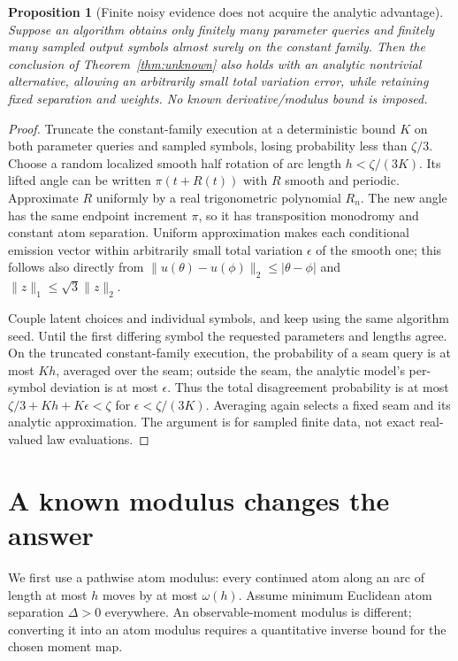 \documentclass[11pt]{article}
\newtheorem{proposition}[theorem]{Proposition}
\theoremstyle{remark}\newtheorem{remark}[theorem]{Remark}
\begin{document}
\begin{proposition}[Finite noisy evidence does not acquire the analytic advantage]\label{prop:noisy-analytic}
Suppose an algorithm obtains only finitely many parameter queries and finitely many sampled output symbols almost surely on the constant family. Then the conclusion of Theorem~\ref{thm:unknown} also holds with an analytic nontrivial alternative, allowing an arbitrarily small total variation error, while retaining fixed separation and weights. No known derivative/modulus bound is imposed.
\end{proposition}
\begin{proof}
Truncate the constant-family execution at a deterministic bound $K$ on both parameter queries and sampled symbols, losing probability less than $\zeta/3$. Choose a random localized smooth half rotation of arc length $h<\zeta/(3K)$. Its lifted angle can be written $\pi(t+R(t))$ with $R$ smooth and periodic. Approximate $R$ uniformly by a real trigonometric polynomial $R_n$. The new angle has the same endpoint increment $\pi$, so it has transposition monodromy and constant atom separation. Uniform approximation makes each conditional emission vector within arbitrarily small total variation $\epsilon$ of the smooth one; this follows also directly from $\|u(\theta)-u(\phi)\|_2\leq|\theta-\phi|$ and $\|z\|_1\leq\sqrt3\|z\|_2$.

Couple latent choices and individual symbols, and keep using the same algorithm seed. Until the first differing symbol the requested parameters and lengths agree. On the truncated constant-family execution, the probability of a seam query is at most $Kh$, averaged over the seam; outside the seam, the analytic model's per-symbol deviation is at most $\epsilon$. Thus the total disagreement probability is at most $\zeta/3+Kh+K\epsilon<\zeta$ for $\epsilon<\zeta/(3K)$. Averaging again selects a fixed seam and its analytic approximation. The argument is for sampled finite data, not exact real-valued law evaluations.
\end{proof}

\section{A known modulus changes the answer}
We first use a pathwise atom modulus: every continued atom along an arc of length at most $h$ moves by at most $\omega(h)$. Assume minimum Euclidean atom separation $\Delta>0$ everywhere. An observable-moment modulus is different; converting it into an atom modulus requires a quantitative inverse bound for the chosen moment map.
\end{document}
